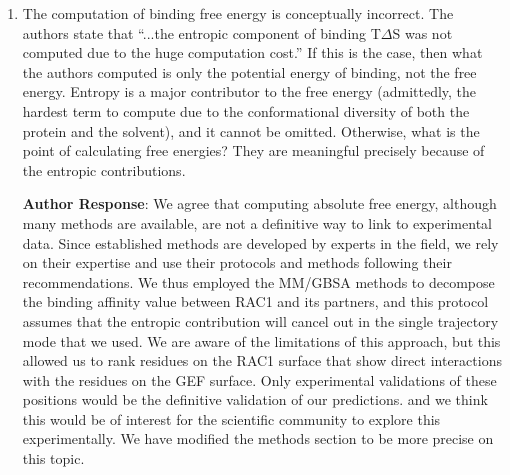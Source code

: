 \documentclass[11pt, a4paper]{article}
\begin{document}
\begin{enumerate}
\textbf{Author Response}: The exact definition of cryptic pocket can be debatable since by definition these pockets are transient, and even if our simulation time is long enough for results presented, it is important to be cautious about their existence. We considered that a pocket could be defined as crytpic, not only if its volume was about the threshold as described above, but also if the pockets was detectable for more few ns. We also took into account the presence of the pockets during simulation replicates, and show the split values in Supplementary Figures \textcolor{red}{S9-S12}. To moderate this analysis, We have rephrased the discussion on this part to also indicate to the readers that the microsecond time scale could be a limitation since no spontaneous pocket openings were sampled in some systems without cosolvent probes.


    \item The computation of binding free energy is conceptually incorrect. The authors state that “...the entropic component of binding T$\Delta$S was not computed due to the huge computation cost.” If this is the case, then what the authors computed is only the potential energy of binding, not the free energy. Entropy is a major contributor to the free energy (admittedly, the hardest term to compute due to the conformational diversity of both the protein and the solvent), and it cannot be omitted. Otherwise, what is the point of calculating free energies? They are meaningful precisely because of the entropic contributions.
    
\textbf{Author Response}: We agree that computing absolute free energy, although many methods are available, are not a definitive way to link to experimental data. Since established methods are developed by experts in the field, we rely on their expertise and use their protocols and methods following their recommendations. We thus  employed the MM/GBSA methods to decompose the binding affinity value between RAC1 and its partners, and this protocol assumes that the entropic contribution will cancel out in the single trajectory mode that we used. We are aware of the limitations of this approach, but this allowed us to rank residues on the RAC1 surface that show direct interactions with the residues on the GEF surface. Only experimental validations of these positions would be the definitive validation of our predictions. and we think this would be of interest for the scientific community to explore this experimentally. We have modified the methods section to be more precise on this topic. 


\end{enumerate}
\end{document}
